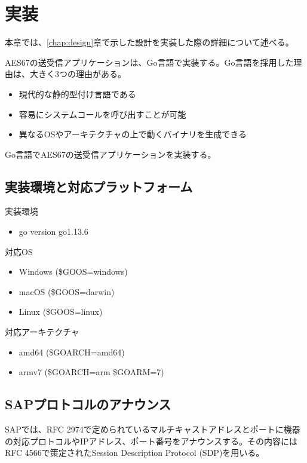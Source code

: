 \chapter{実装}
\label{chap:implementation}

本章では、\ref{chap:design}章で示した設計を実装した際の詳細について述べる。

AES67の送受信アプリケーションは、Go言語で実装する。Go言語を採用した理由は、大きく3つの理由がある。

\begin{itemize}
  \item 現代的な静的型付け言語である
  \item 容易にシステムコールを呼び出すことが可能
  \item 異なるOSやアーキテクチャの上で動くバイナリを生成できる
\end{itemize}

Go言語でAES67の送受信アプリケーションを実装する。

\section{実装環境と対応プラットフォーム}

実装環境

\begin{itemize}
  \item{go version go1.13.6}
\end{itemize}

対応OS

\begin{itemize}
  \item Windows (\$GOOS=windows)
  \item macOS (\$GOOS=darwin)
  \item Linux (\$GOOS=linux)
\end{itemize}

対応アーキテクチャ

\begin{itemize}
  \item amd64 (\$GOARCH=amd64)
  \item armv7 (\$GOARCH=arm \$GOARM=7)
\end{itemize}

\section{SAPプロトコルのアナウンス}

SAPでは、RFC 2974\cite{rfc2974}で定められているマルチキャストアドレスとポートに機器の対応プロトコルやIPアドレス、ポート番号をアナウンスする。その内容にはRFC 4566\cite{rfc4566}で策定されたSession Description Protocol (SDP)を用いる。

